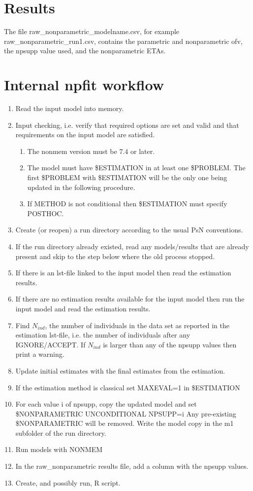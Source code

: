 \section{Results}

The file raw\_nonparametric\_modelname.csv, for example raw\_nonparametric\_run1.csv,
contains the parametric and nonparametric ofv, the npsupp value used,
and the nonparametric ETAs.

\section{Internal npfit workflow}

\begin{enumerate}
\item Read the input model into memory.
\item Input checking, i.e. verify that required options are set and valid and that requirements on the input model
are satisfied.
\begin{enumerate}
\item The nonmem version must be 7.4 or later.
\item The model must have \$ESTIMATION in at least one \$PROBLEM. The first \$PROBLEM with \$ESTIMATION will be the
only one being updated in the following procedure.
\item If METHOD is not conditional then \$ESTIMATION must specify POSTHOC.
\end{enumerate}
\item Create (or reopen) a run directory according to the usual PsN conventions.
\item If the run directory already existed, read any models/results that are already present and skip
to the step below where the old process stopped.
\item If there is an lst-file linked to the input model then read the estimation results.
\item If there are no estimation results available for the input model then run the input model and read the estimation results.
\item Find $N_{ind}$, the number of individuals in the data set as reported in the estimation lst-file,
i.e. the number of individuals after any IGNORE/ACCEPT. If $N_{ind}$ is larger than any of the npsupp values
then print a warning.
\item Update initial estimates with the final estimates from the estimation.
\item If the estimation method is classical set MAXEVAL=1 in \$ESTIMATION 
\item For each value i of npsupp, copy the updated model and set \$NONPARAMETRIC UNCONDITIONAL NPSUPP=i
Any pre-existing \$NONPARAMETRIC will be removed.
Write the model copy in the m1 subfolder of the run directory.
\item Run models with NONMEM
\item In the raw\_nonparametric results file, add a column with the npsupp values. 
\item Create, and possibly run, R script.
\end{enumerate}



